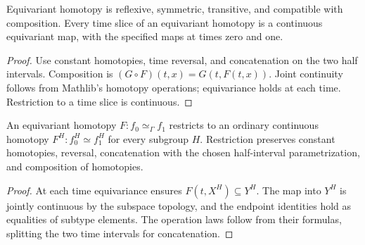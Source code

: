 \begin{proposition}\label{prop:equivariant-homotopy-operations}
Equivariant homotopy is reflexive, symmetric, transitive, and compatible
with composition. Every time slice of an equivariant homotopy is a
continuous equivariant map, with the specified maps at times zero and one.
\end{proposition}
\begin{proof}
\leanok
Use constant homotopies, time reversal, and concatenation on the two half
intervals. Composition is $(G\circ F)(t,x)=G(t,F(t,x))$.
Joint continuity follows from Mathlib's homotopy operations; equivariance
holds at each time. Restriction to a time slice is continuous.
\end{proof}

\begin{proposition}\label{prop:fixed-point-homotopy-restriction}
An equivariant homotopy $F:f_0\simeq_\Gamma f_1$ restricts to an ordinary
continuous homotopy $F^H:f_0^H\simeq f_1^H$ for every subgroup $H$.
Restriction preserves constant homotopies, reversal, concatenation with
the chosen half-interval parametrization, and composition of homotopies.
\end{proposition}
\begin{proof}
\leanok
At each time equivariance ensures $F(t,X^H)\subseteq Y^H$.
The map into $Y^H$ is jointly continuous by the subspace topology, and the
endpoint identities hold as equalities of subtype elements. The operation
laws follow from their formulas, splitting the two time intervals for
concatenation.
\end{proof}


